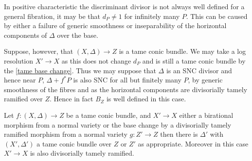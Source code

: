 In positive characteristic the discriminant divisor is not always well defined for a general fibration, it may be that $d_{P} \neq 1$ for infinitely many $P$. This can be caused by either a failure of generic smoothness or inseparability of the horizontal components of $\Delta$ over the base.

Suppose, however, that $(X,\Delta) \to Z$ is a tame conic bundle. We may take a log resolution $X' \to X$ as this does not change $d_{P}$ and is still a tame conic bundle by the \autoref{tame base change}. Thus we may suppose that $\Delta$ is an SNC divisor and hence near $P$, $\Delta+f^{*}P$ is also SNC for all but finitely many $P$, by generic smoothness of the fibres and as the horizontal components are divisorially tamely ramified over $Z$. Hence in fact $B_{Z}$ is well defined in this case.

\begin{lemma}\label{tame base change}
	Let $f\colon (X,\Delta) \to Z$ be a tame conic bundle, and $X' \to X$ either a birational morphism from a normal variety or the base change by a divisorially tamely ramified morphism from a normal variety $g\colon Z' \to Z$ then there is $\Delta'$ with $(X',\Delta')$ a tame conic bundle over $Z$ or $Z'$ as appropriate. Moreover in this case $X' \to X$ is also divisorially tamely ramified.
\end{lemma}

